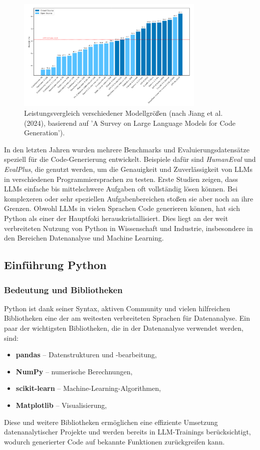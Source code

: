 \documentclass[11pt,a4paper]{article}
\begin{document}
\begin{figure}[H]
    \centering
    \includegraphics[width=0.8\textwidth]{./bilder/performance_comparison.png}
    \caption{Leistungsvergleich verschiedener Modellgrößen (nach Jiang et al. (2024), basierend auf 'A Survey on Large Language Models for Code Generation').}
    \label{fig:performance_comparison}
\end{figure}
In den letzten Jahren wurden mehrere Benchmarks und Evaluierungsdatensätze speziell für die Code-Generierung entwickelt. Beispiele dafür sind \emph{HumanEval}\cite{chen2021evaluatinglargelanguagemodels} und \emph{EvalPlus}\cite{evalplus}, die genutzt werden, um die Genauigkeit und Zuverlässigkeit von LLMs in verschiedenen Programmiersprachen zu testen. Erste Studien zeigen, dass LLMs einfache bis mittelschwere Aufgaben oft vollständig lösen können. Bei komplexeren oder sehr speziellen Aufgabenbereichen stoßen sie aber noch an ihre Grenzen\cite{NEURIPS2023_43e9d647}.
Obwohl LLMs in vielen Sprachen Code generieren können, hat sich Python als einer der Hauptfoki herauskristallisiert. Dies liegt an der weit verbreiteten Nutzung von Python in Wissenschaft und Industrie, insbesondere in den Bereichen Datenanalyse und Machine Learning.

\subsection{Einführung Python}
\label{sec:Python}
\subsubsection{Bedeutung und Bibliotheken}
Python ist dank seiner Syntax, aktiven Community und vielen hilfreichen Bibliotheken eine der am weitesten verbreiteten Sprachen für Datenanalyse. Ein paar der wichtigsten Bibliotheken, die in der Datenanalyse verwendet werden, sind:
\begin{itemize}
    \item \textbf{pandas} -- Datenstrukturen und -bearbeitung,
    \item \textbf{NumPy} -- numerische Berechnungen,
    \item \textbf{scikit-learn} -- Machine-Learning-Algorithmen,
    \item \textbf{Matplotlib} -- Visualisierung,
\end{itemize} 
Diese und weitere Bibliotheken ermöglichen eine effiziente Umsetzung datenanalytischer Projekte und werden bereits in LLM-Trainings berücksichtigt, wodurch generierter Code auf bekannte Funktionen zurückgreifen kann\cite{evalplus,chen2021evaluatinglargelanguagemodels}.
\end{document}
